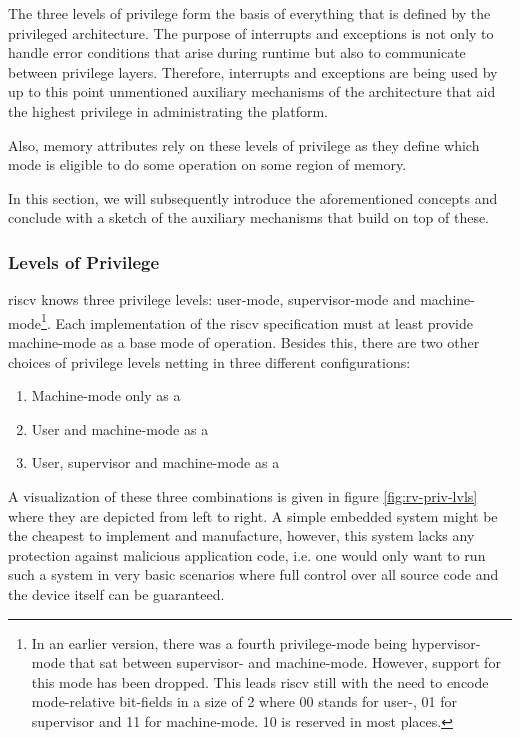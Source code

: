 The three levels of privilege form the basis of everything that is defined by the privileged architecture.
The purpose of interrupts and exceptions is not only to handle error conditions that arise during runtime but also to communicate between privilege layers.
Therefore, interrupts and exceptions are being used by up to this point unmentioned auxiliary mechanisms of the architecture that aid the highest privilege in administrating the platform.

Also, memory attributes rely on these levels of privilege as they define which mode is eligible to do some operation on some region of memory.

In this section, we will subsequently introduce the aforementioned concepts and conclude with a sketch of the auxiliary mechanisms that build on top of these.

\subsubsection{Levels of Privilege}

\gls{riscv} knows three privilege levels: user-mode, supervisor-mode and machine-mode\footnote{%
    In an earlier version, there was a fourth privilege-mode being hypervisor-mode that sat between supervisor- and machine-mode.
    However, support for this mode has been dropped.
    This leads \gls{riscv} still with the need to encode mode-relative bit-fields in a size of 2 where 00 stands for user-, 01 for supervisor and 11 for machine-mode.
    10 is reserved in most places.
}.
Each implementation of the \gls{riscv} specification must at least provide machine-mode as a base mode of operation.
Besides this, there are two other choices of privilege levels netting in three different configurations:
\begin{enumerate}
    \item Machine-mode only as a 
    \item User and machine-mode as a 
    \item User, supervisor and machine-mode as a 
\end{enumerate}

A visualization of these three combinations is given in figure \ref{fig:rv-priv-lvls} where they are depicted from left to right.
A simple embedded system might be the cheapest to implement and manufacture, however, this system lacks any protection against malicious application code, i.e. one would only want to run such a system in very basic scenarios where full control over all source code and the device itself can be guaranteed.

